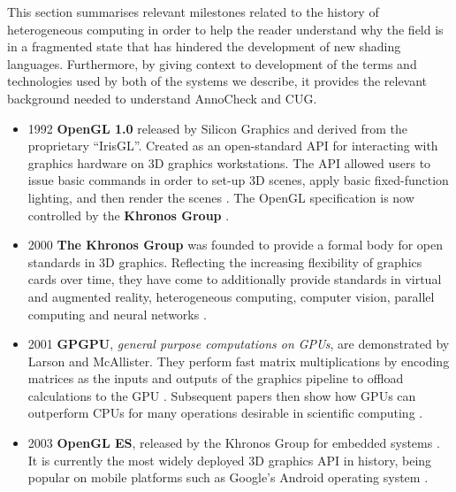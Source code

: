 \documentclass[a4paper,12pt,twoside,openright]{report}
\begin{document}
This section summarises relevant milestones related to the history of
heterogeneous computing in order to help the reader understand why the field is
in a fragmented state that has hindered the development of new shading
languages. Furthermore, by giving context to development of the terms and
technologies used by both of the systems we describe, it provides the relevant
background needed to understand AnnoCheck and CUG.

\begin{itemize}

    \item 1992 \textbf{OpenGL 1.0} released by Silicon Graphics and derived
    from the proprietary ``IrisGL''. Created as an open-standard API for
    interacting with graphics hardware on 3D graphics workstations. The API
    allowed users to issue basic commands in order to set-up 3D scenes, apply
    basic fixed-function lighting, and then render the scenes
    \cite{OpenGL_1_0}. The OpenGL specification is now controlled by the
    \textbf{Khronos Group} \cite{OpenGL} \cite{OpenGLToKhronos}.

    \item 2000 \textbf{The Khronos Group} was founded to provide a formal body
    for open standards in 3D graphics. Reflecting the increasing flexibility of
    graphics cards over time, they have come to additionally provide standards
    in virtual and augmented reality, heterogeneous computing, computer vision,
    parallel computing and neural networks \cite{KhronosGroupAbout}.

    \item 2001 \textbf{GPGPU}, \textit{general purpose computations on GPUs},
    are demonstrated by Larson and McAllister. They perform fast matrix
    multiplications by encoding matrices as the inputs and outputs of the
    graphics pipeline to offload calculations to the GPU \cite{MatrixGPU}.
    Subsequent papers then show how GPUs can outperform CPUs for many
    operations desirable in scientific computing \cite{CUDAtoOpenCL}
    \cite{Kruger03linearalgebra} \cite{LUGPU} \cite{SparsematrixGPU}.

    \item 2003 \textbf{OpenGL ES}, released by the Khronos Group for embedded
    systems \cite{OpenGLESRelease}. It is currently the most widely deployed 3D
    graphics API in history, being popular on mobile platforms such as Google's
    Android operating system \cite{OpenGLES}.


\end{itemize}
\end{document}

